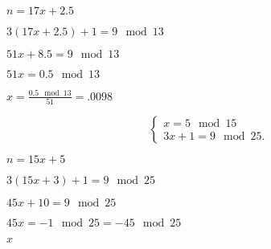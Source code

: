 \documentclass[10pt]{book}
\begin{document}
\begin{mdSnippets}
\begin{mdInlineSnippet}[02fe841315e9e253433d5f3846bc614b]%
$n = 17x + 2.5$\end{mdInlineSnippet}%
\begin{mdInlineSnippet}[2b33c61271e0d71fa4f74a87634783bd]%
$3(17x + 2.5) + 1 = 9 \mod 13$\end{mdInlineSnippet}%
\begin{mdInlineSnippet}[a506ba54934af15f18c55c384c07c790]%
$51x + 8.5 = 9 \mod 13$\end{mdInlineSnippet}%
\begin{mdInlineSnippet}[f7ce0882057924eb45f6f714e8d4c0e2]%
$51x = 0.5 \mod 13$\end{mdInlineSnippet}%
\begin{mdInlineSnippet}%
$x = \frac{0.5 \mod 13} {51} = .0098$\end{mdInlineSnippet}%
\begin{mdDisplaySnippet}[b24687b8eb20387e6ce8b088003a7f25]%
\[%
\left\{\begin{array}{l}
x = 5 \mod 15\\
3x + 1 = 9 \mod 25.
\end{array}\right.
\]%
\end{mdDisplaySnippet}%
\begin{mdInlineSnippet}%
$n = 15x + 5$\end{mdInlineSnippet}%
\begin{mdInlineSnippet}[0aa0d4ae68928fb798270e4d22cf8309]%
$3(15x + 3) + 1 = 9 \mod 25$\end{mdInlineSnippet}%
\begin{mdInlineSnippet}%
$45x + 10 = 9 \mod 25$\end{mdInlineSnippet}%
\begin{mdInlineSnippet}[ee888323ef373f64f7a7a804e9548092]%
$45x = -1 \mod 25 = -45 \mod 25$\end{mdInlineSnippet}%
\begin{mdInlineSnippet}[9dd4e461268c8034f5c8564e155c67a6]%
$x$\end{mdInlineSnippet}%
\begin{mdInlineSnippet}%

\end{mdInlineSnippet}
\end{mdSnippets}
\end{document}
